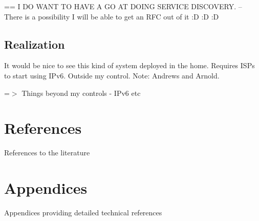 \documentclass[12pt]{report}
\begin{document}
== I DO WANT TO HAVE A GO AT DOING SERVICE DISCOVERY.
-- There is a possibility I will be able to get an RFC out of it :D :D :D

\section{Realization}
It would be nice to see this kind of system deployed in the home. 
Requires ISPs to start using IPv6.
Outside my control. 
Note: Andrews and Arnold.

=$>$ Things beyond my controls - IPv6 etc

\chapter{References}
References to the literature

\chapter{Appendices}
Appendices providing detailed technical references
\end{document}
